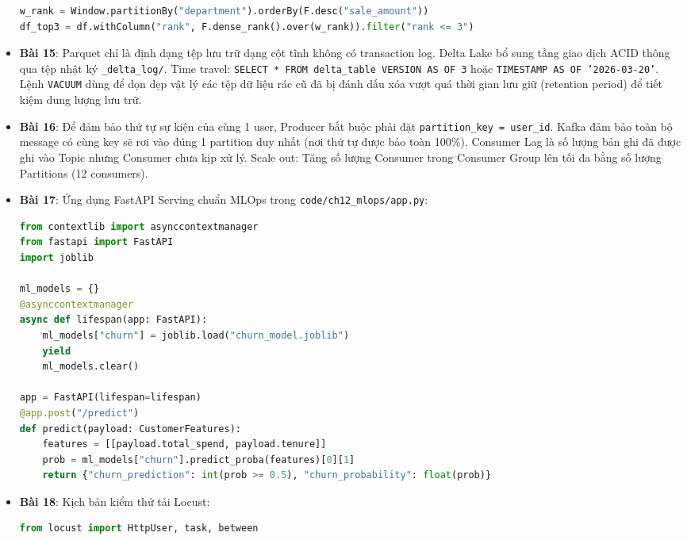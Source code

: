 \begin{dapanbox}
\begin{itemize}
\begin{lstlisting}[language=python]
w_rank = Window.partitionBy("department").orderBy(F.desc("sale_amount"))
df_top3 = df.withColumn("rank", F.dense_rank().over(w_rank)).filter("rank <= 3")
    \end{lstlisting}
    \item \textbf{Bài 15}: Parquet chỉ là định dạng tệp lưu trữ dạng cột tĩnh không có transaction log. Delta Lake bổ sung tầng giao dịch ACID thông qua tệp nhật ký \texttt{\_delta\_log/}. Time travel: \texttt{SELECT * FROM delta\_table VERSION AS OF 3} hoặc \texttt{TIMESTAMP AS OF '2026-03-20'}. Lệnh \texttt{VACUUM} dùng để dọn dẹp vật lý các tệp dữ liệu rác cũ đã bị đánh dấu xóa vượt quá thời gian lưu giữ (retention period) để tiết kiệm dung lượng lưu trữ.
    \item \textbf{Bài 16}: Để đảm bảo thứ tự sự kiện của cùng 1 user, Producer bắt buộc phải đặt \texttt{partition\_key = user\_id}. Kafka đảm bảo toàn bộ message có cùng key sẽ rơi vào đúng 1 partition duy nhất (nơi thứ tự được bảo toàn 100\%). Consumer Lag là số lượng bản ghi đã được ghi vào Topic nhưng Consumer chưa kịp xử lý. Scale out: Tăng số lượng Consumer trong Consumer Group lên tối đa bằng số lượng Partitions (12 consumers).
    \item \textbf{Bài 17}: Ứng dụng FastAPI Serving chuẩn MLOps trong \texttt{code/ch12\_mlops/app.py}:
    \begin{lstlisting}[language=python]
from contextlib import asynccontextmanager
from fastapi import FastAPI
import joblib

ml_models = {}
@asynccontextmanager
async def lifespan(app: FastAPI):
    ml_models["churn"] = joblib.load("churn_model.joblib")
    yield
    ml_models.clear()

app = FastAPI(lifespan=lifespan)
@app.post("/predict")
def predict(payload: CustomerFeatures):
    features = [[payload.total_spend, payload.tenure]]
    prob = ml_models["churn"].predict_proba(features)[0][1]
    return {"churn_prediction": int(prob >= 0.5), "churn_probability": float(prob)}
    \end{lstlisting}
    \item \textbf{Bài 18}: Kịch bản kiểm thử tải Locust:
    \begin{lstlisting}[language=python]
from locust import HttpUser, task, between


\end{lstlisting}
\end{itemize}
\end{dapanbox}
